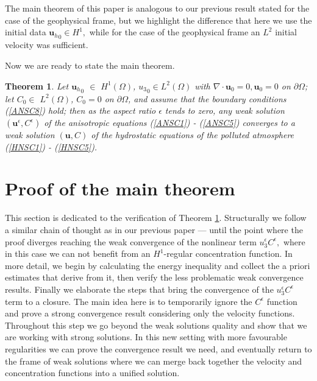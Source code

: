 \documentclass[11pt]{article}
\newtheorem{theorem}{Theorem}
\begin{document}
The main theorem of this paper is analogous to our previous result stated for the case of the geophysical frame, but we highlight the difference that here we use the initial data ${\mathbf{u}_h}_0 \in H^1,$ while for the case of the geophysical frame an $L^2$ initial velocity was sufficient.

Now we are ready to state the main theorem.

\begin{theorem} \label{maintheorem}
  Let ${\mathbf{u}_h}_0$ $\in$ $H^1 (\Omega)$, ${u_3}_0 \in L^2(\Omega)$ with $\nabla \cdot \mathbf{u}_0 = 0, \mathbf{u}_0 = 0$ on $\partial \Omega$; let $C_0 \in$ $L^2 (\Omega)$, $C_0 = 0$ on $ \partial \Omega$, and assume that the boundary conditions (\ref{ANSC8}) hold; then as the aspect ratio $\epsilon$ tends to zero, any weak solution $(\mathbf{u}^\epsilon, C^\epsilon)$ of the anisotropic equations (\ref{ANSC1}) - (\ref{ANSC5}) converges to a weak solution $(\mathbf{u}, C)$ of the hydrostatic equations of the polluted atmosphere (\ref{HNSC1}) - (\ref{HNSC5}).
\end{theorem}
  
\section{Proof of the main theorem} \label{proof}

This section is dedicated to the verification of Theorem \ref{maintheorem}. Structurally we follow a similar chain of thought as in our previous paper --- until the point where the proof diverges reaching the weak convergence of the nonlinear term $u_3^\epsilon C^\epsilon,$ where in this case we can not benefit from an $H^1$-regular concentration function. In more detail, we begin by calculating the energy inequality and collect the a priori estimates that derive from it, then verify the less problematic weak convergence results. Finally we elaborate the steps that bring the convergence of the $u_3^\epsilon C^\epsilon$ term to a closure. The main idea here is to temporarily ignore the $C^\epsilon$ function and prove a strong convergence result considering only the velocity functions. Throughout this step we go beyond the weak solutions quality and show that we are working with strong solutions. In this new setting with more favourable regularities we can prove the convergence result we need, and eventually return to the frame of weak solutions where we can merge back together the velocity and concentration functions into a unified solution.
\end{document}
